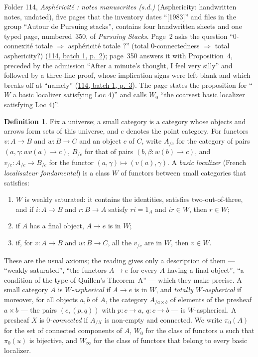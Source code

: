 \documentclass[11pt]{article}
\newcommand{\q}[1]{“#1”}
\newcommand{\fr}[1]{\textfrench{#1}}
\newcommand{\lot}[3]{\href{https://grothendieck.commutator.io/\##1/#2/p#3}{#1, batch #2, p.~#3}}
\theoremstyle{plain}
\theoremstyle{definition}
\newtheorem*{definition}{Definition}
\theoremstyle{remark}
\begin{document}
Folder 114, \emph{\fr{Asphéricité : notes manuscrites (s.d.)}} (Asphericity: handwritten notes, undated), five pages that the inventory dates \q{[1983]} and files in the group \q{Autour de Pursuing stacks}, contains four handwritten sheets and one typed page, numbered~350, of \emph{Pursuing Stacks}. Page~2 asks the question \q{\fr{$0$-connexité totale $\Rightarrow$ asphéricité totale ?}} (total $0$-connectedness $\Rightarrow$ total asphericity?) (\lot{114}{1}{2}); page~350 answers it with Proposition~4, preceded by the admission \q{After a minute's thought, I feel very silly} and followed by a three-line proof, whose implication signs were left blank and which breaks off at \q{namely} (\lot{114}{1}{3}). The page states the proposition for \q{$W$ a basic localizer satisfying Loc 4)} and calls $W_0$ \q{the coarsest basic localizer satisfying Loc 4)}.

\begin{definition}
Fix a universe; a small category is a category whose objects and arrows form sets of this universe, and $e$ denotes the point category. For functors $v : A \to B$ and $w : B \to C$ and an object $c$ of $C$, write $A_{/c}$ for the category of pairs $(a, \gamma : wv(a) \to c)$, $B_{/c}$ for that of pairs $(b, \beta : w(b) \to c)$, and $v_{/c} : A_{/c} \to B_{/c}$ for the functor $(a, \gamma) \mapsto (v(a), \gamma)$. A \emph{basic localizer} (French \emph{localisateur fondamental}) is a class $W$ of functors between small categories that satisfies:
\begin{enumerate}
\item[LA] $W$ is weakly saturated: it contains the identities, satisfies two-out-of-three, and if $i : A \to B$ and $r : B \to A$ satisfy $ri = 1_A$ and $ir \in W$, then $r \in W$;
\item[LB] if $A$ has a final object, $A \to e$ is in $W$;
\item[LC] if, for $v : A \to B$ and $w : B \to C$, all the $v_{/c}$ are in $W$, then $v \in W$.
\end{enumerate}
These are the usual axioms; the reading gives only a description of them --- \q{weakly saturated}, \q{the functors $A \to e$ for every $A$ having a final object}, \q{a condition of the type of Quillen's Theorem~A} --- which they make precise. A small category $A$ is \emph{$W$-aspherical} if $A \to e$ is in $W$, and \emph{totally $W$-aspherical} if moreover, for all objects $a, b$ of $A$, the category $A_{/a \times b}$ of elements of the presheaf $a \times b$ --- the pairs $(c, (p, q))$ with $p : c \to a$, $q : c \to b$ --- is $W$-aspherical. A presheaf $X$ is \emph{$0$-connected} if $A_{/X}$ is non-empty and connected. We write $\pi_0(A)$ for the set of connected components of $A$, $W_0$ for the class of functors $u$ such that $\pi_0(u)$ is bijective, and $W_\infty$ for the class of functors that belong to every basic localizer.
\end{definition}
\end{document}
